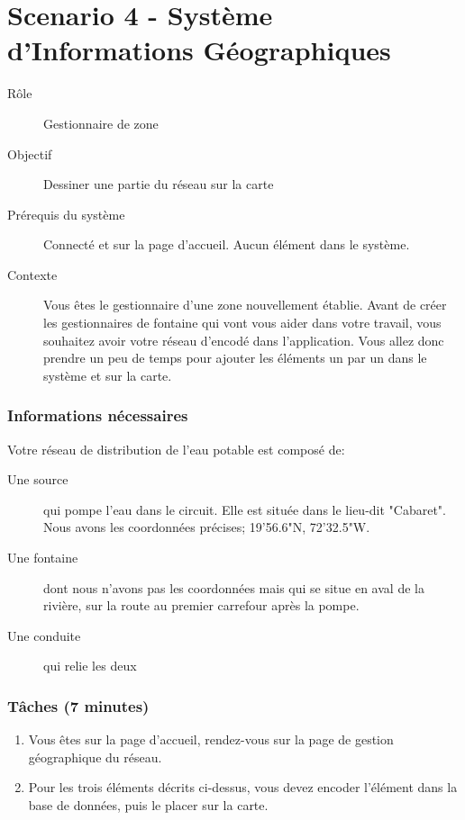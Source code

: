 \documentclass[a4paper, 11pt]{article}
\begin{document}
\section*{Scenario 4 - Système d'Informations Géographiques}
    \begin{description}
        \item[Rôle] Gestionnaire de zone
        \item[Objectif] Dessiner une partie du réseau sur la carte
        \item[Prérequis du système] Connecté et sur la page d'accueil. Aucun élément dans le système.
        \item[Contexte] Vous êtes le gestionnaire d'une zone nouvellement établie. Avant de créer les gestionnaires de fontaine qui vont vous aider dans votre travail, vous souhaitez avoir votre réseau d'encodé dans l'application. Vous allez donc prendre un peu de temps pour ajouter les éléments un par un dans le système et sur la carte.
    \end{description}

    \subsubsection*{Informations nécessaires}
        Votre réseau de distribution de l'eau potable est composé de:
        \begin{description}
            \item[Une source] qui pompe l'eau dans le circuit. Elle est située dans le lieu-dit "Cabaret". Nous avons les coordonnées précises; 19'56.6"N, 72'32.5"W.
            \item[Une fontaine] dont nous n'avons pas les coordonnées mais qui se situe en aval de la rivière, sur la route au premier carrefour après la pompe.
            \item[Une conduite] qui relie les deux
        \end{description}

    \subsubsection*{Tâches (7 minutes)}
        \begin{enumerate}
            \item Vous êtes sur la page d'accueil, rendez-vous sur la page de gestion géographique du réseau.
            \item Pour les trois éléments décrits ci-dessus, vous devez encoder l'élément dans la base de données, puis le placer sur la carte.
        \end{enumerate}
\end{document}
